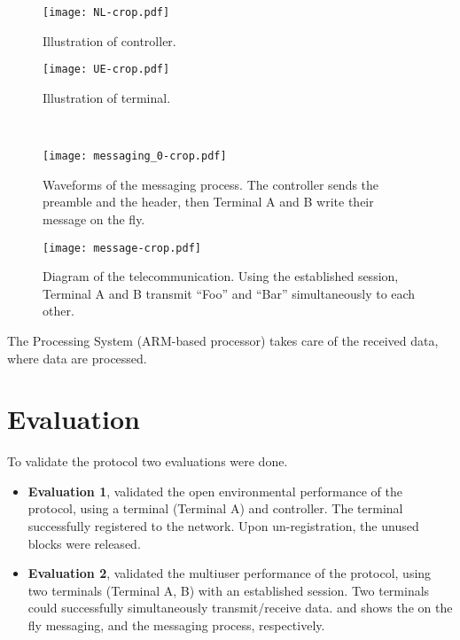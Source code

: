 ﻿\documentclass[twocolumn,9pt]{ltjsarticle}
\renewcommand{\ref}{\Cref}
\begin{document}
\begin{figure*}[!t]
  \centering
  \begin{minipage}[b]{.45\linewidth}
    \centering
    \texttt{[image: NL-crop.pdf]}
    \caption{\label{fig:controller}
      Illustration of controller.
    }
  \end{minipage}\quad
  \begin{minipage}[b]{.45\linewidth}
    \centering
    \texttt{[image: UE-crop.pdf]}
    \caption{\label{fig:terminal}
      Illustration of terminal.
    }
  \end{minipage}\\[5ex]
  \begin{minipage}{\linewidth}
    \centering
    \texttt{[image: messaging\_0-crop.pdf]}
    \caption{\label{fig:messaging}
      Waveforms of the messaging process.
      The controller sends the preamble and the header, then Terminal A and B write their message on the fly.
    }
  \end{minipage}
\end{figure*}

\begin{figure}[tb]
  \centering
  \texttt{[image: message-crop.pdf]}
  \caption{\label{fig:message}
    Diagram of the telecommunication.
    Using the established session, Terminal A and B transmit ``Foo'' and ``Bar'' simultaneously to each other.
  }
\end{figure}

The Processing System (ARM\textregistered -based processor) takes care of the received data, where data are processed.

\section{Evaluation}
To validate the protocol two evaluations were done.
\begin{itemize}
\item \textbf{Evaluation 1}, validated the open environmental performance of the protocol, using a terminal (Terminal A) and controller.
The terminal successfully registered to the network.
  Upon un-registration, the unused blocks were released.
\item \textbf{Evaluation 2}, validated the multiuser performance of the protocol, using two terminals (Terminal A, B) with an established session.
Two terminals could successfully simultaneously transmit/receive data.
  \ref{fig:messaging} and \ref{fig:message} shows the on the fly messaging, and the messaging process, respectively.
\end{itemize}
\end{document}
